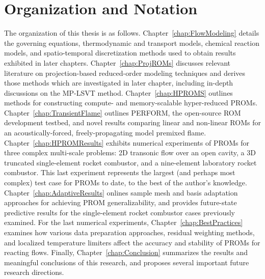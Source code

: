 \section{Organization and Notation}

The organization of this thesis is as follows. Chapter~\ref{chap:FlowModeling} details the governing equations, thermodynamic and transport models, chemical reaction models, and spatio-temporal discretization methods used to obtain results exhibited in later chapters. Chapter~\ref{chap:ProjROMs} discusses relevant literature on projection-based reduced-order modeling techniques and derives those methods which are investigated in later chapter, including in-depth discussions on the MP-LSVT method. Chapter~\ref{chap:HPROMS} outlines methods for constructing compute- and memory-scalable hyper-reduced PROMs. Chapter~\ref{chap:TransientFlame} outlines PERFORM, the open-source ROM development testbed, and novel results comparing linear and non-linear ROMs for an acoustically-forced, freely-propagating model premixed flame. Chapter~\ref{chap:HPROMResults} exhibits numerical experiments of PROMs for three complex multi-scale problems: 2D transonic flow over an open cavity, a 3D truncated single-element rocket combustor, and a nine-element laboratory rocket combustor. This last experiment represents the largest (and perhaps most complex) test case for PROMs to date, to the best of the author's knowledge. Chapter~\ref{chap:AdaptiveResults} onlines sample mesh and basis adaptation approaches for achieving PROM generalizability, and provides future-state predictive results for the single-element rocket combustor cases previously examined. For the last numerical experiments, Chapter~\ref{chap:BestPractices} examines how various data preparation approaches, residual weighting methods, and localized temperature limiters affect the accuracy and stability of PROMs for reacting flows. Finally, Chapter~\ref{chap:Conclusion} summarizes the results and meaningful conclusions of this research, and proposes several important future research directions.

